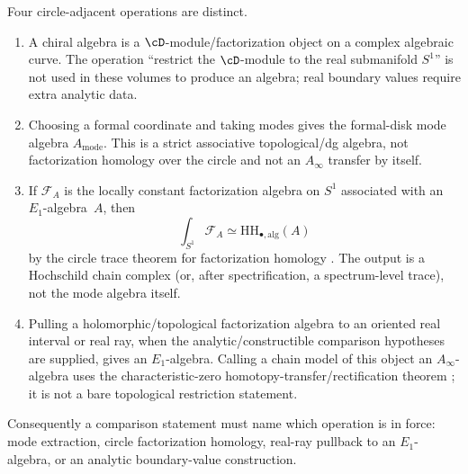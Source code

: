 \begin{remark}
\label{rem:hochschild-circle-restriction-firewall}
Four circle-adjacent operations are distinct.
\begin{enumerate}[label=\textup{(\roman*)}]
\item A chiral algebra is a $\cD$-module/factorization object on a
 complex algebraic curve. The operation ``restrict the $\cD$-module to
 the real submanifold $S^1$'' is not used in these volumes to produce
 an algebra; real boundary values require extra analytic data.
\item Choosing a formal coordinate and taking modes gives the
 formal-disk mode algebra $A_{\mathrm{mode}}$. This is a strict
 associative topological/dg algebra, not factorization homology over
 the circle and not an $A_\infty$ transfer by itself.
\item If $\mathcal F_A$ is the locally constant factorization algebra
 on $S^1$ associated with an $E_1$-algebra~$A$, then
 \[
  \int_{S^1}\mathcal F_A \simeq
  \mathrm{HH}_{\bullet,\mathrm{alg}}(A)
 \]
 by the circle trace theorem for factorization homology
 \cite{BZFN10,AF15,CG17}. The output is a Hochschild chain complex
 \textup{(}or, after spectrification, a spectrum-level trace\textup{)},
 not the mode algebra itself.
\item Pulling a holomorphic/topological factorization algebra to an
 oriented real interval or real ray, when the analytic/constructible
 comparison hypotheses are supplied, gives an $E_1$-algebra. Calling a
 chain model of this object an $A_\infty$-algebra uses the
 characteristic-zero homotopy-transfer/rectification theorem
 \cite{LV12,Kadeishvili80}; it is not a bare topological restriction
 statement.
\end{enumerate}
Consequently a comparison statement must name which operation is in
force: mode extraction, circle factorization homology, real-ray
pullback to an $E_1$-algebra, or an analytic boundary-value
construction.
\end{remark}

